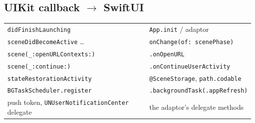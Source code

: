 \documentclass[8pt]{extarticle}
\begin{document}
\begin{multicols}{2}
\section{UIKit callback $\to$ SwiftUI}
{\footnotesize
\begin{tabular}{@{}L{37mm}L{40mm}@{}}
\toprule
\texttt{didFinishLaunching} & \texttt{App.init} / adaptor \\
\texttt{sceneDidBecomeActive} \ldots & \texttt{onChange(of: scenePhase)} \\
\texttt{scene(\_:openURLContexts:)} & \texttt{.onOpenURL} \\
\texttt{scene(\_:continue:)} & \texttt{.onContinueUserActivity} \\
\texttt{stateRestorationActivity} & \texttt{@SceneStorage}, \texttt{path.codable} \\
\texttt{BGTaskScheduler.register} & \texttt{.backgroundTask(.appRefresh)} \\
push token, \texttt{UNUserNotificationCenter} delegate & the adaptor's delegate methods \\
\bottomrule
\end{tabular}\par}

\end{multicols}

\end{document}
